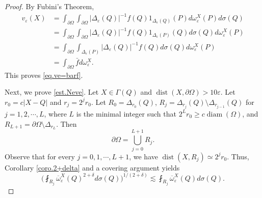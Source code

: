 \documentclass[reqno,12pt]{amsart} %
\theoremstyle{definition}
\theoremstyle{remark}
\numberwithin{equation}{section}
\newcommand{\e}{\varepsilon}
\DeclareMathOperator{\diam}{diam}
\DeclareMathOperator{\dist}{dist}
\begin{document}
\begin{proof}
    By Fubini's Theorem,
    \begin{equation}
    \begin{aligned}
        v_\e(X) & = \int_{\partial \Omega} \int_{\partial \Omega} |\Delta_\e(Q)|^{-1} f(Q) 1_{\Delta_\e(Q)}(P) d\omega^X_\e(P) d\sigma(Q) \\ & = \int_{\partial \Omega} \int_{\partial \Omega} |\Delta_\e(Q)|^{-1} f(Q) 1_{\Delta_\e(P)}(Q) d\sigma(Q) d\omega_\e^X(P) \\
        & = \int_{\partial \Omega} \int_{\Delta_\e(P)} |\Delta_\e(Q)|^{-1} f(Q) d\sigma(Q) d\omega_\e^X(P)\\
        & = \int_{\partial \Omega} \bar{f} d\omega_\e^X.
    \end{aligned}
    \end{equation}
    This proves \eqref{eq.ve=barf}.

    Next, we prove \eqref{est.Neve}. Let $X\in \Gamma(Q)$ and $\dist(X,\partial \Omega) > 10\e$. Let $r_0 = c|X - Q|$ and $r_j = 2^j r_0$. Let $R_0 = \Delta_{r_0}(Q)$, $R_j = \Delta_{r_j}(Q) \setminus \Delta_{r_{j-1}}(Q)$ for $j = 1,2, \cdots, L$, where $L$ is the minimal integer such that $2^L r_0 \ge c\diam(\Omega)$,
    and $R_{L+1} = \partial\Omega \setminus \Delta_{r_L}$. Then
    \begin{equation}
        \partial \Omega = \bigcup_{j = 0}^{L+1} R_j.
    \end{equation}
    Observe that for every $j = 0,1,\cdots, L+1$, we have $\dist(X, R_j) \simeq 2^j r_0$. Thus, Corollary \ref{coro.2+delta} and a covering argument yields
    \begin{equation}
        \bigg( \fint_{R_j} \overline{\omega}_\e^X(Q)^{2+\delta} d\sigma(Q) \bigg)^{1/(2+\delta)} \lesssim \fint_{R_j} \overline{\omega}_\e^X(Q) d\sigma(Q).
    \end{equation}


\end{proof}
\end{document}
